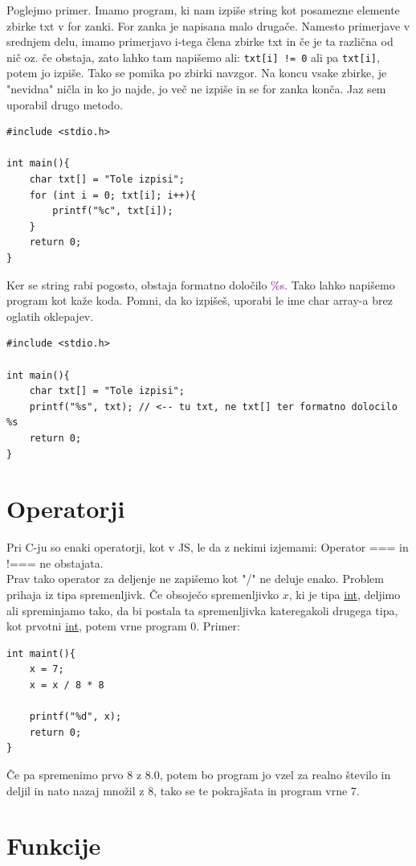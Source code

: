 \documentclass[a4paper, 12pt]{article}
\begin{document}
Poglejmo primer. Imamo program, ki nam izpiše string kot posamezne elemente zbirke txt v for zanki. For zanka je napisana malo drugače. Namesto primerjave v srednjem delu, imamo primerjavo i-tega člena zbirke txt in če je ta različna od nič oz. če obstaja, zato lahko tam napišemo ali: \texttt{txt[i] != 0} ali pa \texttt{txt[i]}, potem jo izpiše. Tako se pomika po zbirki navzgor. Na koncu vsake zbirke, je "nevidna" ničla in ko jo najde, jo več ne izpiše in se for zanka konča. Jaz sem uporabil drugo metodo.

\begin{lstlisting}
#include <stdio.h>

int main(){
	char txt[] = "Tole izpisi";
	for (int i = 0; txt[i]; i++){
		printf("%c", txt[i]);
	}
	return 0;
}
\end{lstlisting}

Ker se string rabi pogosto, obstaja formatno določilo \textcolor{purple}{\%s}. Tako lahko napišemo program kot kaže koda. Pomni, da ko izpišeš, uporabi le ime char array-a brez oglatih oklepajev.

\begin{lstlisting}
#include <stdio.h>

int main(){
	char txt[] = "Tole izpisi";
	printf("%s", txt); // <-- tu txt, ne txt[] ter formatno dolocilo %s
	return 0;
}
\end{lstlisting}

\section{Operatorji}

Pri C-ju so enaki operatorji, kot v JS, le da z nekimi izjemami: Operator === in !=== ne obstajata.\\
Prav tako operator za deljenje ne zapišemo kot "/" ne deluje enako. Problem prihaja iz tipa spremenljivk. Če obsoječo spremenljivko $x$, ki je tipa \underline{int}, deljimo ali spreminjamo tako, da bi postala ta spremenljivka kateregakoli drugega tipa, kot prvotni \underline{int}, potem vrne program 0. Primer:
\pagebreak
\begin{lstlisting}
int maint(){	
	x = 7;
	x = x / 8 * 8
	
	printf("%d", x);
	return 0;
}
\end{lstlisting}
Če pa spremenimo prvo 8 z 8.0, potem bo program jo vzel za realno število in deljil in nato nazaj množil z 8, tako se te pokrajšata in program vrne 7.
\section{Funkcije}
\end{document}

